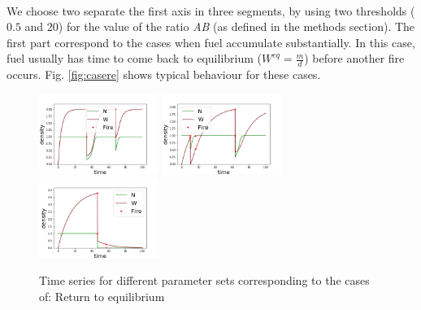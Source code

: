 \documentclass{article}
\begin{document}
\paragraph{}
We choose two separate the first axis in three segments, by using two thresholds ($0.5$ and $20$) for the value of the ratio \textit{AB} (as defined in the methods section). The first part correspond to the cases when fuel accumulate substantially. In this case, fuel usually has time to come back to equilibrium ($W^{eq}=\frac{m}{d}$) before another fire occurs. Fig. \ref{fig:casere} shows typical behaviour for these cases.

\begin{figure}[h!]
\centering
\includegraphics[width=3.9cm]{return_to_eq_1.png}
\includegraphics[width=3.9cm]{return_to_eq_2.png}
\includegraphics[width=3.9cm]{return_to_eq_3.png}
\caption{Time series for different parameter sets corresponding to the cases of: Return to equilibrium}
\end{figure}
\end{document}
